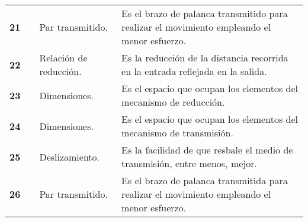 \begin{table}[H]
\begin{tabular}{|c|c|p{10em}|p{21em}|}
		\cline{1-1}\cline{3-4}    \textbf{ 21} &       &  Par transmitido. &  Es el brazo de palanca transmitido para realizar el movimiento empleando el menor esfuerzo. \\
		\cline{1-1}\cline{3-4}    \textbf{ 22} &       &  Relación de reducción. &  Es la reducción de la distancia recorrida en la entrada reflejada en la salida. \\
		\cline{1-1}\cline{3-4}    \textbf{ 23} &       &  Dimensiones. &  Es el espacio que ocupan los elementos del mecanismo de reducción. \\
		\cline{1-1}\cline{3-4}    \textbf{ 24} &       &  Dimensiones. &  Es el espacio que ocupan los elementos del mecanismo de transmisión. \\
		\cline{1-1}\cline{3-4}    \textbf{ 25} &       &  Deslizamiento. &  Es la facilidad de que resbale el medio de transmisión, entre menos, mejor. \\
		\cline{1-1}\cline{3-4}    \textbf{ 26} &       &  Par transmitido. &  Es el brazo de palanca transmitida para realizar el movimiento empleando el menor esfuerzo. \\
		\hline
	\end{tabular}%
	\label{tab:addlabel2}%
\end{table}%

\newpage

